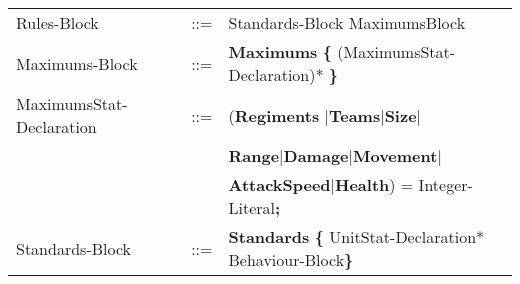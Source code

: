 \begin{center}
\begin{longtable}{ l l l }
		Rules-Block					&	::=	&Standards-Block MaximumsBlock 				\\
		Maximums-Block				&	::=	&{\bf Maximums} {\bf \{} (MaximumsStat-Declaration)* {\bf \}}\\
		MaximumsStat-Declaration	&	::=	&({\bf Regiments }$\mid${\bf Teams}$\mid${\bf Size}$\mid$\\
									&		&{\bf Range}$\mid${\bf Damage}$\mid${\bf Movement}$\mid$\\
									&		&{\bf AttackSpeed}$\mid${\bf Health}) =  Integer-Literal{\bf ;}\\
		Standards-Block				&	::=	&{\bf Standards} {\bf \{ } UnitStat-Declaration* Behaviour-Block\bf{\} }		\\
	\end{longtable}
		\end{center}					     